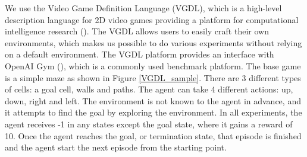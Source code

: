 We use the Video Game Definition Language (VGDL), which is a high-level description language for 2D video games providing a platform for computational intelligence research (\cite{Schaul2013}).
The VGDL allows users to easily craft their own environments, which makes us possible to do various experiments without relying on a default environment. The VGDL platform provides an interface with OpenAI Gym (\cite{Brockman2016}), which is a commonly used benchmark platform.
The base game is a simple maze as shown in Figure \ref{VGDL_sample}.
There are 3 different types of cells: a goal cell, walls and paths. The agent can take 4 different actions: up, down, right and left.
The environment is not known to the agent in advance, and it attempts to find the goal by exploring the environment.
In all experiments, the agent receives -1 in any states except the goal state, where it gains a reward of 10.
Once the agent reaches the goal, or termination state, that episode is finished and the agent start the next episode from the starting point.

